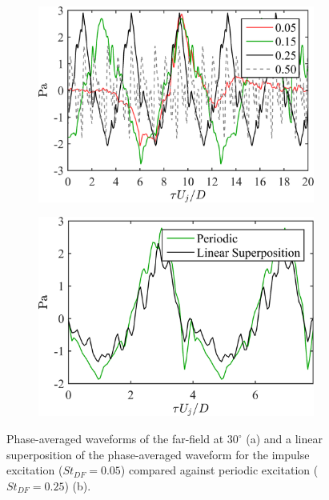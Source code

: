 \begin{figure}
	\centering
	\begin{subfigure}{.5\textwidth}
		\centering
		\includegraphics[width=0.95\linewidth]{Figures/ch3_farfield_phavg_v2.png}
		\caption{}
		\label{fig:ch3_farfield_phavg}
	\end{subfigure}%
	\begin{subfigure}{.5\textwidth}
		\centering
		\includegraphics[width=0.95\linewidth]{Figures/ch3_farfield_linear_v2.png}
		\caption{}
		\label{fig:ch3_farfield_linear}
	\end{subfigure}
	\caption{Phase-averaged waveforms of the far-field at $30^\circ$ (a) and a linear superposition of the phase-averaged waveform for the impulse excitation ($St_{DF} = 0.05$) compared against periodic excitation ($St_{DF} = 0.25$) (b).}
	\label{fig:ch3_farfield}
\end{figure}

